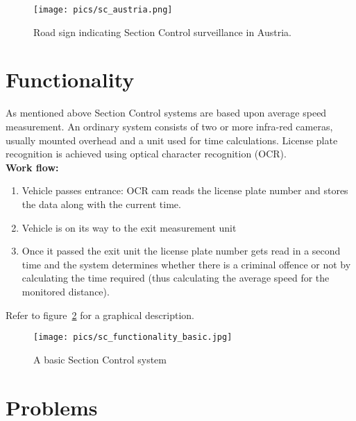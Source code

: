 \documentclass[oneside,bachelor,etd]{BYUPhys}
\begin{document}
\begin{figure}
    \centerline{\texttt{[image: pics/sc\_austria.png]}}
    \caption[Section Control indicator]{\label{fig:Section Control indicator}
	Road sign indicating Section Control surveillance in Austria.}
\end{figure}


\section{Functionality}
\label{sec:1functionality}

As mentioned above Section Control systems are based upon average speed measurement. 
An ordinary system consists of two or more infra-red cameras, usually mounted overhead 
and a unit used for time calculations. License plate recognition is achieved using optical character recognition (OCR). \\
\textbf{Work flow:}

\begin{enumerate}
\item Vehicle passes entrance: OCR cam reads the license plate number and stores the data along with the current time.
\item Vehicle is on its way to the exit measurement unit
\item Once it passed the exit unit the license plate number gets read in a second time and 
the system determines whether there is a criminal offence or not by calculating the time required 
(thus calculating the average speed for the monitored distance).
\end{enumerate}

Refer to figure~\ref{fig:Section Control Functionality} for a graphical description.

\begin{figure}
    \centerline{\texttt{[image: pics/sc\_functionality\_basic.jpg]}}
    \caption[Section Control Functionality]{\label{fig:Section Control Functionality}
	A basic Section Control system}
\end{figure}


\section{Problems}
\label{sec:1problems}
\end{document}
